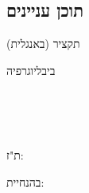 \documentclass[12pt,a4paper,oneside,openany]{report}
\newcommand{\HebTocEntries}{}
\begin{document}
\clearpage
\begin{hebrew}


\clearpage
\section*{תוכן עניינים}
\vspace{6pt}
{
\noindent\makebox[2.2em][r]{}\hspace{0.8em}תקציר (באנגלית)\dotfill\pageref{page:abstract}\par
\HebTocEntries
\noindent\makebox[2.2em][r]{}\hspace{0.8em}ביבליוגרפיה\dotfill\pageref{chapter:bibliography}\par}

\clearpage
\thispagestyle{empty}
\begin{center}\singlespacing
\vspace*{0.6cm}
{\large\bfseries \UniversityHe}\\[5pt]
{\normalsize \FacultyHe}\\[3pt]
{\normalsize \ProgramHe}

\vspace{3cm}
{\LARGE\bfseries\color{bgunavy}\ThesisTitleHe\par}
\vspace{0.5cm}
{\large\ThesisSubtitleHe\par}

\vspace{2.2cm}
{\large \DocTypeHe}

\vspace{2.6cm}
{\large\bfseries \AuthorHe}\\[6pt]
{\normalsize ת"ז: \StudentID}

\vspace{2.2cm}
{\normalsize בהנחיית:}\\[8pt]
{\large\bfseries \AdvisorsHe}

\vfill
{\normalsize \SubmissionDateHe}
\end{center}
\end{hebrew}
\end{document}

